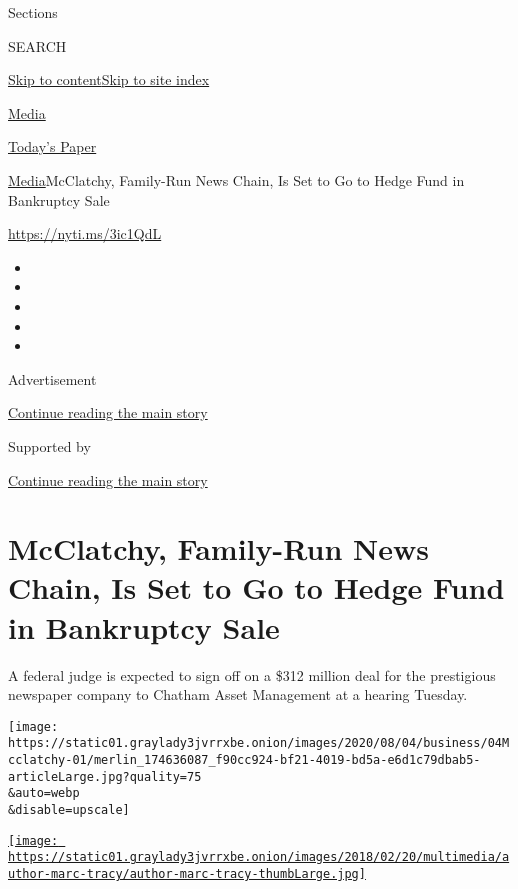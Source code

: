 Sections

SEARCH

\protect\hyperlink{site-content}{Skip to
content}\protect\hyperlink{site-index}{Skip to site index}

\href{https://www.nytimes3xbfgragh.onion/section/business/media}{Media}

\href{https://myaccount.nytimes3xbfgragh.onion/auth/login?response_type=cookie\&client_id=vi}{}

\href{https://www.nytimes3xbfgragh.onion/section/todayspaper}{Today's
Paper}

\href{/section/business/media}{Media}\textbar{}McClatchy, Family-Run
News Chain, Is Set to Go to Hedge Fund in Bankruptcy Sale

\url{https://nyti.ms/3ic1QdL}

\begin{itemize}
\item
\item
\item
\item
\item
\end{itemize}

Advertisement

\protect\hyperlink{after-top}{Continue reading the main story}

Supported by

\protect\hyperlink{after-sponsor}{Continue reading the main story}

\hypertarget{mcclatchy-family-run-news-chain-is-set-to-go-to-hedge-fund-in-bankruptcy-sale}{%
\section{McClatchy, Family-Run News Chain, Is Set to Go to Hedge Fund in
Bankruptcy
Sale}\label{mcclatchy-family-run-news-chain-is-set-to-go-to-hedge-fund-in-bankruptcy-sale}}

A federal judge is expected to sign off on a \$312 million deal for the
prestigious newspaper company to Chatham Asset Management at a hearing
Tuesday.

\texttt{[image: https://static01.graylady3jvrrxbe.onion/images/2020/08/04/business/04Mcclatchy-01/merlin\_174636087\_f90cc924-bf21-4019-bd5a-e6d1c79dbab5-articleLarge.jpg?quality=75\\\&auto=webp\\\&disable=upscale]}

\href{https://www.nytimes3xbfgragh.onion/by/marc-tracy}{\texttt{[image: https://static01.graylady3jvrrxbe.onion/images/2018/02/20/multimedia/author-marc-tracy/author-marc-tracy-thumbLarge.jpg]}}

